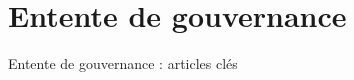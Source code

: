 \section{Entente de gouvernance}

\begin{frame}{Entente de gouvernance : articles clés}
\end{frame}

